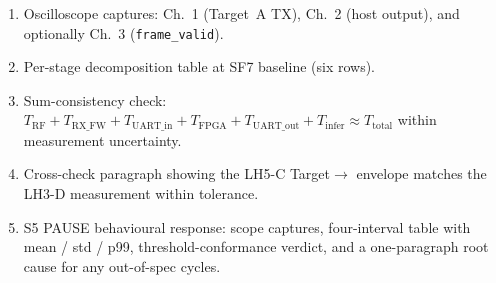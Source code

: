 \documentclass[11pt,letterpaper]{article}
\begin{document}
\begin{tcolorbox}[deliverable={Lab Handout 5-C Deliverable}]
	\begin{enumerate}[leftmargin=1.2em]
		\item Oscilloscope captures: Ch.~1 (Target~A \mbox{TX}), Ch.~2 (host output), and optionally Ch.~3 (\texttt{frame\_valid}).
		\item Per-stage decomposition table at SF7 baseline (six rows).
		\item Sum-consistency check: $T_{\text{RF}} + T_{\text{RX\_FW}} + T_{\text{UART\_in}} + T_{\text{FPGA}} + T_{\text{UART\_out}} + T_{\text{infer}} \approx T_{\text{total}}$ within measurement uncertainty.
		\item Cross-check paragraph showing the LH5-C Target$\to$\FPGA{} envelope matches the LH3-D measurement within tolerance.
		\item S5 PAUSE behavioural response: scope captures, four-interval table with mean / std / p99, threshold-conformance verdict, and a one-paragraph root cause for any out-of-spec cycles.
	\end{enumerate}
\end{tcolorbox}

\printhandoutglossary
\end{document}

